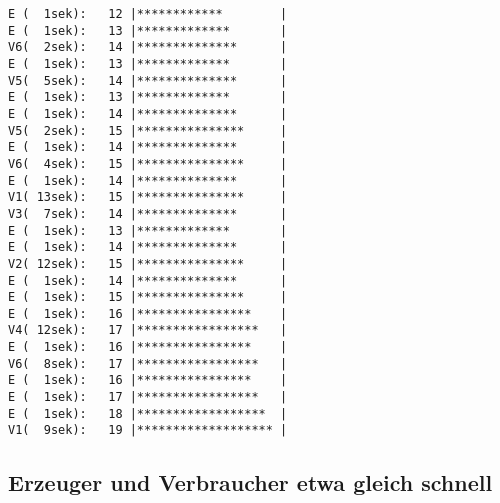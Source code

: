 \begin{quellcode}[H]
\begin{scriptsize}
\begin{spacing}{1.0}
\begin{verbatim}
E (  1sek):   12 |************        |
E (  1sek):   13 |*************       |
V6(  2sek):   14 |**************      |
E (  1sek):   13 |*************       |
V5(  5sek):   14 |**************      |
E (  1sek):   13 |*************       |
E (  1sek):   14 |**************      |
V5(  2sek):   15 |***************     |
E (  1sek):   14 |**************      |
V6(  4sek):   15 |***************     |
E (  1sek):   14 |**************      |
V1( 13sek):   15 |***************     |
V3(  7sek):   14 |**************      |
E (  1sek):   13 |*************       |
E (  1sek):   14 |**************      |
V2( 12sek):   15 |***************     |
E (  1sek):   14 |**************      |
E (  1sek):   15 |***************     |
E (  1sek):   16 |****************    |
V4( 12sek):   17 |*****************   |
E (  1sek):   16 |****************    |
V6(  8sek):   17 |*****************   |
E (  1sek):   16 |****************    |
E (  1sek):   17 |*****************   |
E (  1sek):   18 |******************  |
V1(  9sek):   19 |******************* |
\end{verbatim}
\caption{Erzeuger wartet 1 ZE, 6 zufällige Verbraucher}
\label{out:esv}
\end{spacing}
\end{scriptsize}
\end{quellcode}


\subsection{Erzeuger und Verbraucher etwa gleich schnell} %
